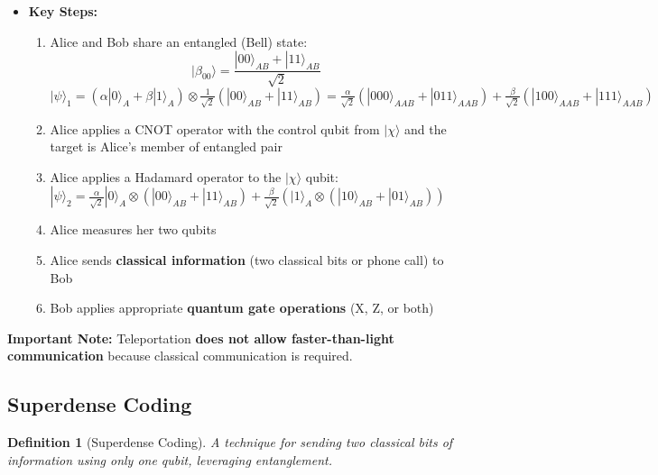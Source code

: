 \documentclass{article}
\newtheorem{definition}[theorem]{Definition}
\begin{document}
\begin{itemize}
    \item \textbf{Key Steps:}
    \begin{enumerate}
        \item Alice and Bob share an entangled (Bell) state: \[ |\beta_{00}\rangle = \frac{|00\rangle_{AB} + |11\rangle_{AB}}{\sqrt{2}} \]
        \subitem  \(|\psi\rangle_{1} = (\alpha|0\rangle_A + \beta|1\rangle_A) \otimes \frac{1}{\sqrt{2}} (|00\rangle_{AB} + |11\rangle_{AB}) = \frac{\alpha}{\sqrt{2}}(|000\rangle_{AAB} + |011\rangle_{AAB}) + \frac{\beta}{\sqrt{2}}(|100\rangle_{AAB} + |111\rangle_{AAB})\)
        \item Alice applies a CNOT operator with the control qubit from \(|\chi\rangle\) and the target is Alice's member of entangled pair
        \item Alice applies a Hadamard operator to the \(|\chi\rangle\) qubit: \(|\psi\rangle_{2} = \frac{\alpha}{\sqrt{2}}|0\rangle_{A} \otimes (|00\rangle_{AB} + |11\rangle_{AB}) + \frac{\beta}{\sqrt{2}}(|1\rangle_{A} \otimes (|10\rangle_{AB} + |01\rangle_{AB}))\)
        \item Alice measures her two qubits
        \item Alice sends \textbf{classical information} (two classical bits or phone call) to Bob
        \item Bob applies appropriate \textbf{quantum gate operations} (X, Z, or both)
    \end{enumerate}
\end{itemize}

\begin{conceptbox}
\textbf{Important Note:} Teleportation \textbf{does not allow faster-than-light communication} because classical communication is required.
\end{conceptbox}

\subsection{Superdense Coding}
\begin{definition}[Superdense Coding]
A technique for sending two classical bits of information using only one qubit, leveraging entanglement.
\end{definition}
\end{document}
